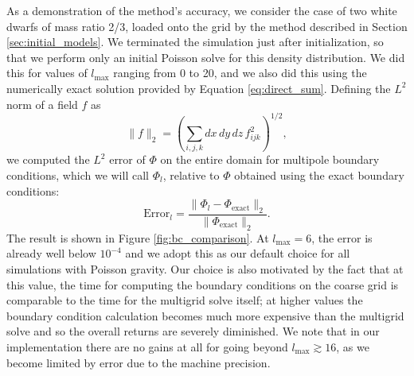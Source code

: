 \documentclass{emulateapj}
\begin{document}
As a demonstration of the method's accuracy, we consider the case of two 
white dwarfs of mass ratio 2/3, loaded onto the grid by the method described 
in Section \ref{sec:initial_models}. We terminated the simulation just after
initialization, so that we perform only an initial Poisson solve for this 
density distribution. We did this for values of $l_{\text{max}}$ ranging
from 0 to 20, and we also did this using the numerically exact solution 
provided by Equation \ref{eq:direct_sum}.  Defining the $L^2$
norm of a field $f$ as
\begin{equation}
  \| f \|_2 = \left(\sum_{i,j,k} dx\, dy\, dz\, f_{ijk}^2\right)^{1/2},
\end{equation}
we computed the $L^2$ error of $\Phi$ on the entire domain for multipole 
boundary conditions, which we will call $\Phi_l$, relative to $\Phi$ 
obtained using the exact boundary conditions:
\begin{equation}
  \text{Error}_l = \frac{\|\Phi_l - \Phi_{\text{exact}}\|_2}{\|\Phi_{\text{exact}}\|_2}.
\end{equation}
The result is shown in Figure \ref{fig:bc_comparison}. At $l_{\text{max}} = 6$,
the error is already well below $10^{-4}$ and we adopt this as our default 
choice for all simulations with Poisson gravity. Our choice is also motivated by the 
fact that at this value, the time for computing the boundary conditions on the
coarse grid is comparable to the time for the multigrid solve itself; at higher values 
the boundary condition calculation becomes much more expensive than the multigrid solve
and so the overall returns are severely diminished. We note that in our implementation 
there are no gains at all for going beyond $l_{\text{max}} \gtrsim 16$, as we 
become limited by error due to the machine precision.
\end{document}

